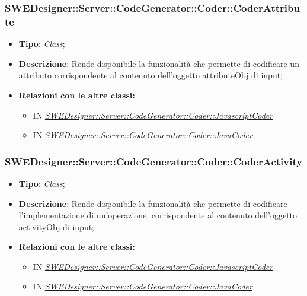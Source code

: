 \documentclass[../SpecificaTecnica.tex]{subfiles}
\begin{document}
			
			\subsubsection{SWEDesigner::Server::CodeGenerator::Coder::CoderAttribute}
			\hypertarget{SWEDesigner::Server::CodeGenerator::Coder::CoderAttribute}{}
			\begin{itemize}
				\item \textbf{Tipo}: \emph{Class};
				\item \textbf{Descrizione}: Rende disponibile la funzionalità che permette di codificare un attributo corrispondente al contenuto dell'oggetto attributeObj di input;
				\item \textbf{Relazioni con le altre classi:}
				\begin{itemize}
					\item IN \hyperlink{SWEDesigner::Server::CodeGenerator::Coder::JavascriptCoder}{\emph{SWEDesigner::Server::CodeGenerator::Coder::JavascriptCoder}}
					\item IN \hyperlink{SWEDesigner::Server::CodeGenerator::Coder::JavaCoder}{\emph{SWEDesigner::Server::CodeGenerator::Coder::JavaCoder}}
				\end{itemize}	
			\end{itemize}
			
			
			
			\subsubsection{SWEDesigner::Server::CodeGenerator::Coder::CoderActivity}
			\hypertarget{SWEDesigner::Server::CodeGenerator::Coder::CoderActivity}{}
			\begin{itemize}
				\item \textbf{Tipo}: \emph{Class};
				\item \textbf{Descrizione}: Rende disponibile la funzionalità che permette di codificare l'implementazione di un'operazione, corrispondente al contenuto dell'oggetto activityObj di input; 
				\item \textbf{Relazioni con le altre classi:}
				\begin{itemize}
					\item IN \hyperlink{SWEDesigner::Server::CodeGenerator::Coder::JavascriptCoder}{\emph{SWEDesigner::Server::CodeGenerator::Coder::JavascriptCoder}}
					\item IN \hyperlink{SWEDesigner::Server::CodeGenerator::Coder::JavaCoder}{\emph{SWEDesigner::Server::CodeGenerator::Coder::JavaCoder}}
				\end{itemize}	
			\end{itemize}
			
\end{document}
